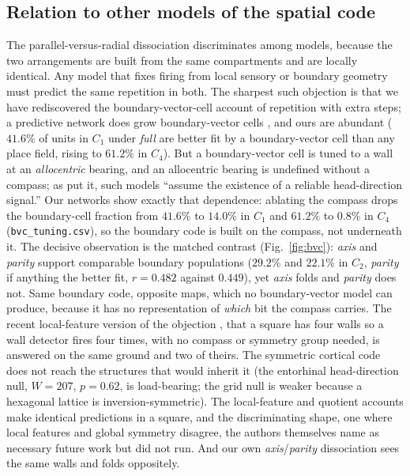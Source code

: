 \documentclass[9pt,lineno]{elife}
\begin{document}
\subsection*{Relation to other models of the spatial code}

The parallel-versus-radial dissociation discriminates among models, because the two arrangements are
built from the same compartments and are locally identical. Any model that fixes firing from local
sensory or boundary geometry must predict the same repetition in both. The sharpest such objection is
that we have rediscovered the boundary-vector-cell account of repetition \citep{grieves2018bvc} with
extra steps; a predictive network does grow boundary-vector cells \citep{uria2020}, and ours are
abundant ($41.6\%$ of units in $C_1$ under \textit{full} are better fit by a boundary-vector cell than
any place field, rising to $61.2\%$ in $C_4$). But a boundary-vector cell is tuned to a wall at an
\emph{allocentric} bearing, and an allocentric bearing is undefined without a compass; as
\citet{julian2018} put it, such models ``assume the existence of a reliable head-direction signal.'' Our
networks show exactly that dependence: ablating the compass drops the boundary-cell fraction from
$41.6\%$ to $14.0\%$ in $C_1$ and $61.2\%$ to $0.8\%$ in $C_4$ (\texttt{bvc\_tuning.csv}), so the
boundary code is built on the compass, not underneath it. The decisive observation is the matched
contrast (Fig.~\ref{fig:bvc}): \textit{axis} and \textit{parity} support comparable boundary populations
($29.2\%$ and $22.1\%$ in $C_2$, \textit{parity} if anything the better fit, $r = 0.482$ against
$0.449$), yet \textit{axis} folds and \textit{parity} does not. Same boundary code, opposite maps,
which no boundary-vector model can produce, because it has no representation of \emph{which} bit the
compass carries. The recent local-feature version of the objection \citep{lachance2024}, that a square
has four walls so a wall detector fires four times, with no compass or symmetry group needed, is
answered on the same ground and two of theirs. The symmetric cortical code does not reach the structures
that would inherit it (the entorhinal head-direction null, $W = 207$, $p = 0.62$, is load-bearing; the
grid null is weaker because a hexagonal lattice is inversion-symmetric). The local-feature and quotient
accounts make identical predictions in a square, and the discriminating shape, one where local features
and global symmetry disagree, the authors themselves name as necessary future work but did not run. And
our own \textit{axis}/\textit{parity} dissociation sees the same walls and folds oppositely.
\end{document}
